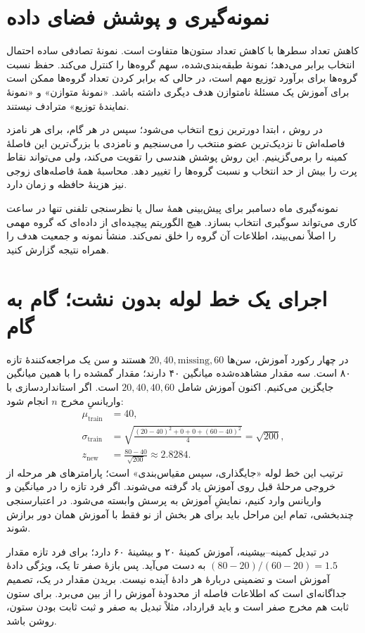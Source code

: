 \documentclass[12pt,a4paper,oneside]{report}
\newcounter{ex}[chapter]
\begin{document}
\section{نمونه‌گیری و پوشش فضای داده}
کاهش تعداد سطرها با کاهش تعداد ستون‌ها متفاوت است. نمونهٔ تصادفی ساده احتمال انتخاب برابر می‌دهد؛ نمونهٔ طبقه‌بندی‌شده، سهم گروه‌ها را کنترل می‌کند. حفظ نسبت گروه‌ها برای برآورد توزیع مهم است، در حالی که برابر کردن تعداد گروه‌ها ممکن است برای آموزش یک مسئلهٔ نامتوازن هدف دیگری داشته باشد. «نمونهٔ متوازن» و «نمونهٔ نمایندهٔ توزیع» مترادف نیستند.

در روش ، ابتدا دورترین زوج انتخاب می‌شود؛ سپس در هر گام، برای هر نامزد فاصله‌اش تا نزدیک‌ترین عضو منتخب را می‌سنجیم و نامزدی با بزرگ‌ترین این فاصلهٔ کمینه را برمی‌گزینیم. این روش پوشش هندسی را تقویت می‌کند، ولی می‌تواند نقاط پرت را بیش از حد انتخاب و نسبت گروه‌ها را تغییر دهد. محاسبهٔ همهٔ فاصله‌های زوجی نیز هزینهٔ حافظه و زمان دارد.

نمونه‌گیری ماه دسامبر برای پیش‌بینی همهٔ سال یا نظرسنجی تلفنی تنها در ساعت کاری می‌تواند سوگیری انتخاب بسازد. هیچ الگوریتم پیچیده‌ای از داده‌ای که گروه مهمی را اصلاً نمی‌بیند، اطلاعات آن گروه را خلق نمی‌کند. منشأ نمونه و جمعیت هدف را همراه نتیجه گزارش کنید.
\section{اجرای یک خط لوله بدون نشت؛ گام به گام}
در چهار رکورد آموزش، سن‌ها $20,40,\text{missing},60$ هستند و سن یک مراجعه‌کنندهٔ تازه ۸۰ است. سه مقدار مشاهده‌شده میانگین ۴۰ دارند؛ مقدار گمشده را با همین میانگین جایگزین می‌کنیم. اکنون آموزش شامل $20,40,40,60$ است. اگر استانداردسازی با واریانسِ مخرج $n$ انجام شود:
\begin{align*}
\mu_{\mathrm{train}}&=40,\\
\sigma_{\mathrm{train}}&=\sqrt{\frac{(20-40)^2+0+0+(60-40)^2}{4}}=\sqrt{200},\\
z_{\mathrm{new}}&=\frac{80-40}{\sqrt{200}}\approx2.8284.
\end{align*}
ترتیب این خط لوله «جایگذاری، سپس مقیاس‌بندی» است؛ پارامترهای هر مرحله از خروجی مرحلهٔ قبل روی آموزش یاد گرفته می‌شوند. اگر فرد تازه را در میانگین و واریانس وارد کنیم، نمایشِ آموزش به پرسش وابسته می‌شود. در اعتبارسنجی چندبخشی، تمام این مراحل باید برای هر بخش از نو فقط با آموزش همان دور برازش شوند.

در تبدیل کمینه–بیشینه، آموزش کمینهٔ ۲۰ و بیشینهٔ ۶۰ دارد؛ برای فرد تازه مقدار $(80-20)/(60-20)=1.5$ به دست می‌آید. پس بازهٔ صفر تا یک، ویژگی دادهٔ آموزش است و تضمینی دربارهٔ هر دادهٔ آینده نیست. بریدن مقدار در یک، تصمیم جداگانه‌ای است که اطلاعات فاصله از محدودهٔ آموزش را از بین می‌برد. برای ستون ثابت هم مخرج صفر است و باید قرارداد، مثلاً تبدیل به صفر و ثبت ثابت بودن ستون، روشن باشد.
\end{document}
